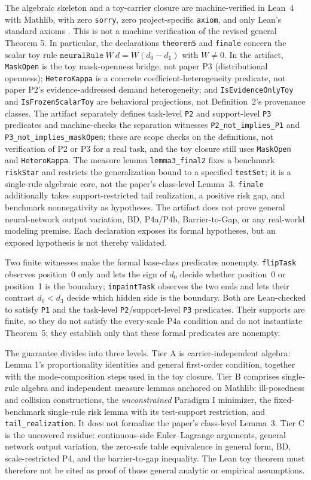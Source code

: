 \documentclass[twoside,11pt]{article}
\begin{document}
The algebraic skeleton and a toy-carrier closure are machine-verified in Lean~4 with Mathlib, with zero \texttt{sorry}, zero project-specific \texttt{axiom}, and only Lean's standard axioms \citep{yang2023}. This is not a machine verification of the revised general Theorem 5. In particular, the declarations \texttt{theorem5} and \texttt{finale} concern the scalar toy rule $\texttt{neuralRule}\ W\ d=W(d_0-d_1)$ with $W\neq0$. In the artifact, \texttt{MaskOpen} is the toy mask-openness bridge, not paper P3 (distributional openness); \texttt{HeteroKappa} is a concrete coefficient-heterogeneity predicate, not paper P2's evidence-addressed demand heterogeneity; and \texttt{IsEvidenceOnlyToy} and \texttt{IsFrozenScalarToy} are behavioral projections, not Definition~2's provenance classes. The artifact separately defines task-level \texttt{P2} and support-level \texttt{P3} predicates and machine-checks the separation witnesses \texttt{P2\_not\_implies\_P1} and \texttt{P3\_not\_implies\_maskOpen}; these are scope checks on the definitions, not verification of P2 or P3 for a real task, and the toy closure still uses \texttt{MaskOpen} and \texttt{HeteroKappa}. The measure lemma \texttt{lemma3\_final2} fixes a benchmark \texttt{riskStar} and restricts the generalization bound to a specified \texttt{testSet}; it is a single-rule algebraic core, not the paper's class-level Lemma~3. \texttt{finale} additionally takes support-restricted tail realization, a positive risk gap, and benchmark nonnegativity as hypotheses. The artifact does not prove general neural-network output variation, BD, P4a/P4b, Barrier-to-Gap, or any real-world modeling premise. Each declaration exposes its formal hypotheses, but an exposed hypothesis is not thereby validated.

Two finite witnesses make the formal base-class predicates nonempty. \texttt{flipTask} observes position~0 only and lets the sign of $d_0$ decide whether position~0 or position~1 is the boundary; \texttt{inpaintTask} observes the two ends and lets their contrast $d_0<d_3$ decide which hidden side is the boundary. Both are Lean-checked to satisfy \texttt{P1} and the task-level \texttt{P2}/support-level \texttt{P3} predicates. Their supports are finite, so they do not satisfy the every-scale P4a condition and do not instantiate Theorem~5; they establish only that these formal predicates are nonempty.

The guarantee divides into three levels. Tier A is carrier-independent algebra: Lemma 1's proportionality identities and general first-order condition, together with the mode-composition steps used in the toy closure. Tier B comprises single-rule algebra and independent measure lemmas anchored on Mathlib: ill-posedness and collision constructions, the \emph{unconstrained} Paradigm I minimizer, the fixed-benchmark single-rule risk lemma with its test-support restriction, and \texttt{tail\_realization}. It does not formalize the paper's class-level Lemma~3. Tier C is the uncovered residue: continuous-side Euler--Lagrange arguments, general network output variation, the zero-safe table equivalence in general form, BD, scale-restricted P4, and the barrier-to-gap inequality. The Lean toy theorem must therefore not be cited as proof of those general analytic or empirical assumptions.
\end{document}
